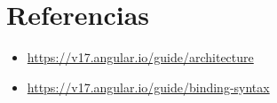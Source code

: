 \documentclass{article}
\begin{document}
	
  \newpage
  \section{Referencias}
  \begin{itemize}
    \item \url{https://v17.angular.io/guide/architecture}
    \item \url{https://v17.angular.io/guide/binding-syntax}
  \end{itemize}

%
%
%
			
\end{document}
